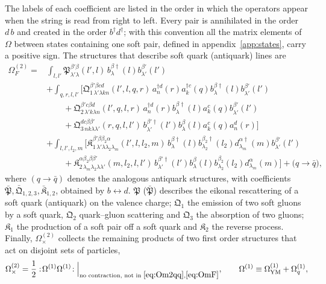 \documentclass[11pt,a4paper]{article}
\numberwithin{equation}{section}
\newcommand{\mf}[1]{\mathfrak{#1}}
\newcommand{\dg}{\dagger}
\newcommand{\OM}{\Omega}
\begin{document}
The labels of each coefficient are listed in the order in which the operators appear when the
string is read from right to left. Every pair is annihilated in the order $d\,b$ and created in
the order $b^{\dg}d^{\dg}$; with this convention all the matrix elements of $\OM$ between states
containing one soft pair, defined in appendix~\ref{app:states}, carry a positive sign. The
structures that describe soft quark (antiquark) lines are
{\small
\begin{align}
\OM^{(2)}_{F}=&\int_{l,l'}\mf P^{\beta'\beta}_{\lambda'\lambda}(l',l)\,
b^{\beta\dg}_{\lambda}(l)b^{\beta'}_{\lambda'}(l')
\nonumber\\
&+\int_{q,r,l,l'}\Big[\mf Q^{\beta'\beta cd}_{1\,\lambda'\lambda kn}(l',l,q,r)\,
a^{\dg d}_{n}(r)a^{\dg c}_{k}(q)b^{\beta\dg}_{\lambda}(l)b^{\beta'}_{\lambda'}(l')
\nonumber\\
&\qquad+\mf Q^{\beta'c\beta d}_{2\,\lambda'k\lambda n}(l',q,l,r)\,
a^{\dg d}_{n}(r)b^{\beta\dg}_{\lambda}(l)a^{c}_{k}(q)b^{\beta'}_{\lambda'}(l')
\nonumber\\
&\qquad+\mf Q^{dc\beta\beta'}_{3\,nk\lambda\lambda'}(r,q,l,l')\,
b^{\beta'\dg}_{\lambda'}(l')b^{\beta}_{\lambda}(l)a^{c}_{k}(q)a^{d}_{n}(r)\Big]
\nonumber\\
&+\int_{l,l',l_{2},m}\Big[\mf K^{\beta'\beta\beta_{2}\alpha}_{1\,\lambda'\lambda\lambda_{2}\lambda_{m}}(l',l,l_{2},m)\,
b^{\beta\dg}_{\lambda}(l)b^{\beta_{2}\dg}_{\lambda_{2}}(l_{2})d^{\alpha\dg}_{\lambda_{m}}(m)b^{\beta'}_{\lambda'}(l')
\nonumber\\
&\qquad+\mf K^{\alpha\beta_{2}\beta\beta'}_{2\,\lambda_{m}\lambda_{2}\lambda\lambda'}(m,l_{2},l,l')\,
b^{\beta'\dg}_{\lambda'}(l')b^{\beta}_{\lambda}(l)b^{\beta_{2}}_{\lambda_{2}}(l_{2})d^{\alpha}_{\lambda_{m}}(m)\Big]
+\big(q\to\bar q\big),
\label{eq:OmF}
\end{align}}
where $(q\to\bar q)$ denotes the analogous antiquark structures, with coefficients
$\bar{\mf P},\bar{\mf Q}_{1,2,3},\bar{\mf K}_{1,2}$, obtained by $b\leftrightarrow d$. $\mf P$
($\bar{\mf P}$) describes the eikonal rescattering of a soft quark (antiquark) on the valence
charge; $\mf Q_{1}$ the emission of two soft gluons by a soft quark, $\mf Q_{2}$ quark--gluon
scattering and $\mf Q_{3}$ the absorption of two gluons; $\mf K_{1}$ the production of a soft pair
off a soft quark and $\mf K_{2}$ the reverse process. Finally, $\OM^{(2)}_{\times}$ collects the
remaining products of two first order structures that act on disjoint sets of particles,
\begin{equation}
\OM^{(2)}_{\times}=\frac12:\!\OM^{(1)}\OM^{(1)}\!:\Big|_{\text{no contraction, not in }\eqref{eq:Om2qq},\eqref{eq:OmF}},
\qquad \OM^{(1)}\equiv\OM^{(1)}_{\rm YM}+\OM^{(1)}_{q},
\label{eq:Omx}
\end{equation}
\end{document}
